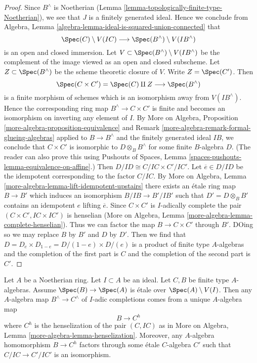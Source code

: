 \begin{proof}
Since $B^\wedge$ is Noetherian (Lemma
\ref{lemma-topologically-finite-type-Noetherian}),
we see that $J$ is a finitely generated
ideal. Hence we conclude from
Algebra, Lemma \ref{algebra-lemma-ideal-is-squared-union-connected}
that
$$
\Spec(C) \setminus V(IC) \longrightarrow \Spec(B^\wedge) \setminus V(IB^\wedge)
$$
is an open and closed immersion. Let
$V \subset \Spec(B^\wedge) \setminus V(IB^\wedge)$ be the complement
of the image viewed as an open and closed subscheme.
Let $Z \subset \Spec(B^\wedge)$ be the scheme
theoretic closure of $V$. Write $Z = \Spec(C')$. Then
$$
\Spec(C \times C') = \Spec(C) \amalg Z \longrightarrow \Spec(B^\wedge)
$$
is a finite morphism of schemes which is an isomorphism away from
$V(IB^\wedge)$. Hence the corresponding ring map $B^\wedge \to C \times C'$
is finite and becomes an isomorphism on inverting any element of $I$. By
More on Algebra, Proposition \ref{more-algebra-proposition-equivalence}
and Remark \ref{more-algebra-remark-formal-glueing-algebras}
applied to $B \to B^\wedge$ and the finitely generated ideal $IB$, we
conclude that $C \times C'$ is isomorphic to $D \otimes_B B^\wedge$
for some finite $B$-algebra $D$. (The reader can also prove this using
Pushouts of Spaces, Lemma \ref{spaces-pushouts-lemma-equivalence-on-affine}.)
Then $D/ID \cong C/IC \times C'/IC'$. Let $\overline{e} \in D/ID$
be the idempotent corresponding to the factor $C/IC$.
By More on Algebra, Lemma
\ref{more-algebra-lemma-lift-idempotent-upstairs} there exists an
\'etale ring map $B \to B'$ which induces an isomorphism
$B/IB \to B'/IB'$ such that $D' = D \otimes_B B'$ contains an
idempotent $e$ lifting $\overline{e}$. Since $C \times C'$
is $I$-adically complete the pair $(C \times C', IC \times IC')$
is henselian
(More on Algebra, Lemma \ref{more-algebra-lemma-complete-henselian}).
Thus we can factor the map $B \to C \times C'$ through $B'$.
DOing so we may replace $B$ by $B'$ and $D$ by $D'$. Then
we find that $D = D_e \times D_{1 - e} = D/(1 - e) \times D/(e)$
is a product of finite type $A$-algebras and the completion of the
first part is $C$ and the completion of the second part is $C'$.
\end{proof}

\begin{lemma}
\label{lemma-fully-faithful-etale-over-complement}
Let $A$ be a Noetherian ring. Let $I \subset A$ be an ideal.
Let $C, B$ be finite type $A$-algebras. Assume $\Spec(B) \to \Spec(A)$ is
\'etale over $\Spec(A) \setminus V(I)$. Then any $A$-algebra
map $B^\wedge \to C^\wedge$ of $I$-adic completions
comes from a unique $A$-algebra map
$$
B \longrightarrow C^h
$$
where $C^h$ is the henselization of the pair $(C, IC)$ as
in More on Algebra, Lemma \ref{more-algebra-lemma-henselization}.
Moreover, any $A$-algebra homomorphism $B \to C^h$ factors through
some \'etale $C$-algebra $C'$ such that $C/IC \to C'/IC'$ is an isomorphism.
\end{lemma}

